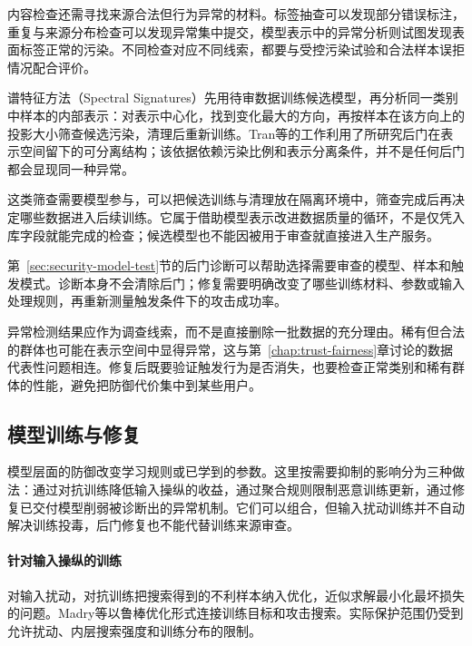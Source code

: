 内容检查还需寻找来源合法但行为异常的材料。标签抽查可以发现部分错误标注，重复与来源分布检查可以发现异常集中提交，模型表示中的异常分析则试图发现表面标签正常的污染。不同检查对应不同线索，都要与受控污染试验和合法样本误拒情况配合评价。

谱特征方法（Spectral Signatures）先用待审数据训练候选模型，再分析同一类别中样本的内部表示：对表示中心化，找到变化最大的方向，再按样本在该方向上的投影大小筛查候选污染，清理后重新训练。Tran等的工作利用了所研究后门在表示空间留下的可分离结构；该依据依赖污染比例和表示分离条件，并不是任何后门都会显现同一种异常。

这类筛查需要模型参与，可以把候选训练与清理放在隔离环境中，筛查完成后再决定哪些数据进入后续训练。它属于借助模型表示改进数据质量的循环，不是仅凭入库字段就能完成的检查；候选模型也不能因被用于审查就直接进入生产服务。

第~\ref{sec:security-model-test}节的后门诊断可以帮助选择需要审查的模型、样本和触发模式。诊断本身不会清除后门；修复需要明确改变了哪些训练材料、参数或输入处理规则，再重新测量触发条件下的攻击成功率。

异常检测结果应作为调查线索，而不是直接删除一批数据的充分理由。稀有但合法的群体也可能在表示空间中显得异常，这与第~\ref{chap:trust-fairness}章讨论的数据代表性问题相连。修复后既要验证触发行为是否消失，也要检查正常类别和稀有群体的性能，避免把防御代价集中到某些用户。

\subsection{模型训练与修复}
\label{sec:security-prediction-defense}
\label{sec:security-model-defense}

模型层面的防御改变学习规则或已学到的参数。这里按需要抑制的影响分为三种做法：通过对抗训练降低输入操纵的收益，通过聚合规则限制恶意训练更新，通过修复已交付模型削弱被诊断出的异常机制。它们可以组合，但输入扰动训练并不自动解决训练投毒，后门修复也不能代替训练来源审查。

\paragraph{针对输入操纵的训练}

对输入扰动，对抗训练把搜索得到的不利样本纳入优化，近似求解最小化最坏损失的问题。Madry等以鲁棒优化形式连接训练目标和攻击搜索。实际保护范围仍受到允许扰动、内层搜索强度和训练分布的限制。

